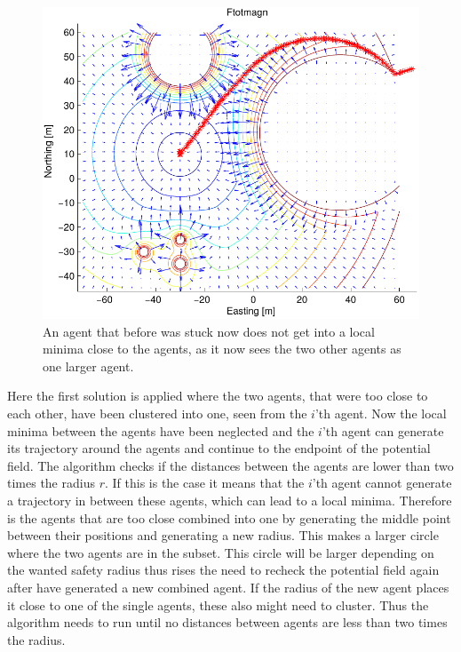 \documentclass[a4paper,conference]{IEEEtran}
\begin{document}
\begin{figure}[htbp]
  \includegraphics[width=\linewidth]{fig/ftotmagnfigpdf4}
	\caption{An agent that before was stuck now does not get into a
		local minima close to the agents, as it now sees the two other
		agents as one larger agent.}
  \label{fig:solroevproblem}
\end{figure}

Here the first solution is applied where the two agents, that were too
close to each other, have been clustered into one, seen from the
$i$'th agent. Now the local minima between the agents have been
neglected and the $i$'th agent can generate its trajectory around the
agents and continue to the endpoint of the potential field. The
algorithm checks if the distances between the agents are lower than two
times the radius $r$. If this is the case it means that the $i$'th agent cannot
generate a trajectory in between these agents, which can lead to a
local minima. Therefore is the agents that are too close combined into
one by generating the middle point between their positions and
generating a new radius. This makes a larger circle where the two
agents are in the subset. This circle will be larger depending on the
wanted safety radius thus rises the need to recheck the potential
field again after have generated a new combined agent. If the radius
of the new agent places it close to one of the single agents, these
also might need to cluster. Thus the algorithm needs to run until no
distances between agents are less than two times the radius.
\end{document}
